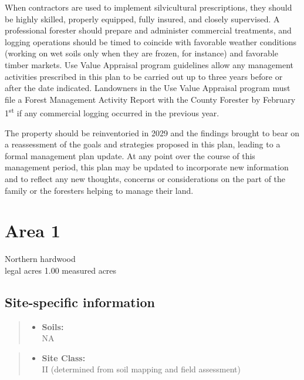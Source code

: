 \documentclass[]{tufte-handout}
\providecommand{\tightlist}{%
  \setlength{\itemsep}{0pt}\setlength{\parskip}{0pt}}
\begin{document}
When contractors are used to implement silvicultural prescriptions, they
should be highly skilled, properly equipped, fully insured, and closely
supervised. A professional forester should prepare and administer
commercial treatments, and logging operations should be timed to
coincide with favorable weather conditions (working on wet soils only
when they are frozen, for instance) and favorable timber markets. Use
Value Appraisal program guidelines allow any management activities
prescribed in this plan to be carried out up to three years before or
after the date indicated. Landowners in the Use Value Appraisal program
must file a Forest Management Activity Report with the County Forester
by February 1\textsuperscript{st} if any commercial logging occurred in
the previous year.

The property should be reinventoried in 2029 and the findings brought to
bear on a reassessment of the goals and strategies proposed in this
plan, leading to a formal management plan update. At any point over the
course of this management period, this plan may be updated to
incorporate new information and to reflect any new thoughts, concerns or
considerations on the part of the family or the foresters helping to
manage their land.

\newpage

\section{Area 1}\label{area-1}

Northern hardwood\\
 legal acres \textbar{} 1.00 measured acres

\subsection{Site-specific information}\label{site-specific-information}

\begin{quote}
\begin{itemize}
\tightlist
\item
  \textbf{Soils:}\\
  \indent\indent  NA
\end{itemize}
\end{quote}

\begin{quote}
\begin{itemize}
\tightlist
\item
  \textbf{Site Class:}\\
  \vspace{2pt} II (determined from soil mapping and field assessment)
\end{itemize}
\end{quote}
\end{document}
